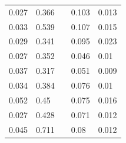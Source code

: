 \documentclass{article}
\begin{document}
\begin{table}[H]
\begin{tabular}{|p{4cm}|p{4cm}|p{0cm}|p{4cm}|p{4cm}|}
0.027 & 0.366 & & 0.103 & 0.013 \\ \cline{1-5}
0.033 & 0.539 & & 0.107 & 0.015 \\ \cline{1-5}
0.029 & 0.341 & & 0.095 & 0.023 \\ \cline{1-5}
0.027 & 0.352 & & 0.046 & 0.01 \\ \cline{1-5}
0.037 & 0.317 & & 0.051 & 0.009 \\ \cline{1-5}
0.034 & 0.384 & & 0.076 & 0.01 \\ \cline{1-5}
0.052 & 0.45 & & 0.075 & 0.016 \\ \cline{1-5}
0.027 & 0.428 & & 0.071 & 0.012 \\ \cline{1-5}
0.045 & 0.711 & & 0.08 & 0.012 \\ \cline{1-5}
\end{tabular}
\end{table}
\end{document}
